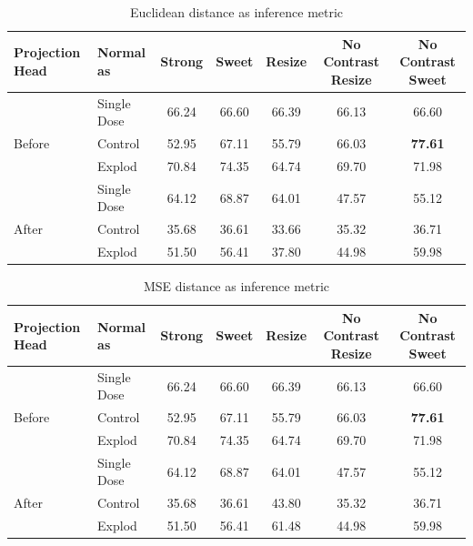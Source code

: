 \begin{table}[H]
  \centering
  \begin{tabular}{@{}llccccc@{}}
  \toprule
  Projection Head & Normal as       & Strong & Sweet & Resize & No Contrast Resize & No Contrast Sweet \\ \midrule
                  & Single Dose    & 66.24      & 66.60     & 66.39      & 66.13                  & 66.60                 \\
  Before          & Control        & 52.95      & 67.11     & 55.79      & 66.03                  & \textbf{77.61}                 \\
                  & Explod         & 70.84      & 74.35     & 64.74      & 69.70                  & 71.98                 \\ \midrule
                  & Single Dose    & 64.12      & 68.87     & 64.01      & 47.57                  & 55.12                 \\
  After           & Control        & 35.68      & 36.61     & 33.66      & 35.32                  & 36.71                 \\
                  & Explod         & 51.50      & 56.41     & 37.80      & 44.98                  & 59.98                 \\ \bottomrule
  \end{tabular}
  \caption{Euclidean distance as inference metric}
  \label{tab:table_eucli}
\end{table}

\begin{table}[H]
  \centering
  \begin{tabular}{@{}llccccc@{}}
  \toprule
  Projection Head & Normal as       & Strong & Sweet & Resize & No Contrast Resize & No Contrast Sweet \\ \midrule
                  & Single Dose    & 66.24      & 66.60     & 66.39      & 66.13                  & 66.60                 \\
  Before          & Control        & 52.95      & 67.11     & 55.79      & 66.03                  & \textbf{77.61}                 \\
                  & Explod         & 70.84      & 74.35    & 64.74      & 69.70                  & 71.98                 \\ \midrule
                  & Single Dose    & 64.12      & 68.87     & 64.01      & 47.57                  & 55.12                 \\
  After           & Control        & 35.68      & 36.61     & 43.80      & 35.32                  & 36.71                 \\
                  & Explod         & 51.50      & 56.41     & 61.48      & 44.98                  & 59.98                 \\ \bottomrule
  \end{tabular}
  \caption{MSE distance as inference metric}
  \label{tab:table_mse}
\end{table}

